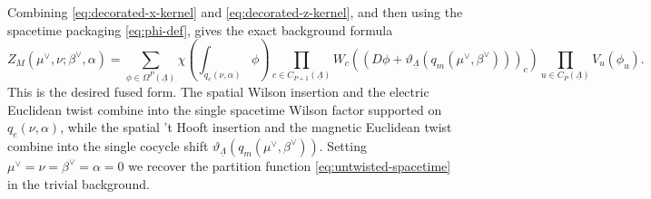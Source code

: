 Combining \eqref{eq:decorated-x-kernel} and \eqref{eq:decorated-z-kernel}, and then
using the spacetime packaging \eqref{eq:phi-def}, gives the exact background formula
\begin{equation}
	Z_M(\mu^\vee,\nu;\beta^\vee,\alpha)
	=
	\sum_{\phi\in\Omega^P(\underline\Lambda)}
	\chi\left(\int_{q_e(\nu,\alpha)}\phi\right)
	\prod_{c\in C_{P+1}(\underline\Lambda)}
	W_c\left(
	(D\phi+\vartheta_{\underline\Lambda}(q_m(\mu^\vee,\beta^\vee)))_c
	\right)
	\prod_{u\in C_P(\underline\Lambda)}
	V_u(\phi_u).
	\label{eq:decorated-spacetime}
\end{equation}
This is the desired fused form.  The spatial Wilson insertion and the electric Euclidean
twist combine into the single spacetime Wilson factor supported on
\(q_e(\nu,\alpha)\), while the spatial 't Hooft insertion and the magnetic Euclidean twist
combine into the single cocycle shift
\(\vartheta_{\underline\Lambda}(q_m(\mu^\vee,\beta^\vee))\). Setting $\mu^\vee=\nu=\beta^\vee=\alpha=0$ we recover the partition function \eqref{eq:untwisted-spacetime} in the trivial background.
